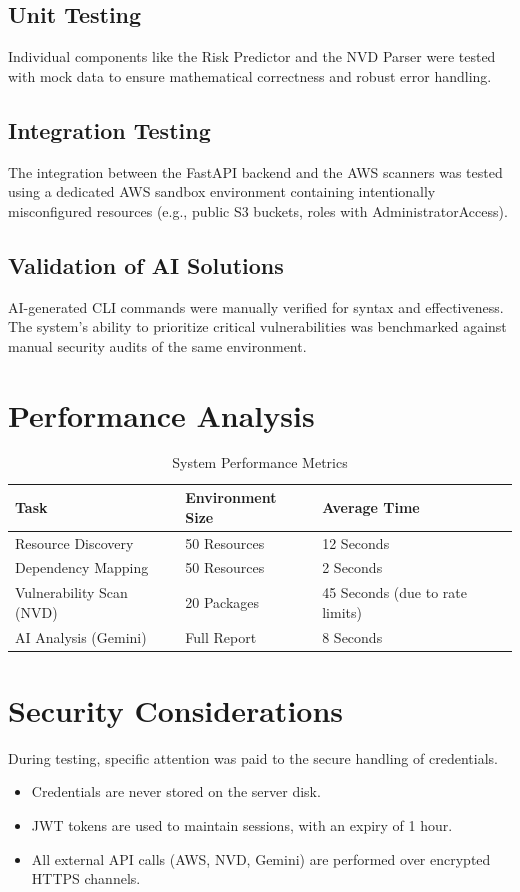\subsection{Unit Testing}
Individual components like the Risk Predictor and the NVD Parser were tested with mock data to ensure mathematical correctness and robust error handling.

\subsection{Integration Testing}
The integration between the FastAPI backend and the AWS scanners was tested using a dedicated AWS sandbox environment containing intentionally misconfigured resources (e.g., public S3 buckets, roles with AdministratorAccess).

\subsection{Validation of AI Solutions}
AI-generated CLI commands were manually verified for syntax and effectiveness. The system's ability to prioritize critical vulnerabilities was benchmarked against manual security audits of the same environment.

\section{Performance Analysis}
\begin{table}[h]
\centering
\caption{System Performance Metrics}
\renewcommand{\arraystretch}{1.3}
\begin{tabular}{|l|l|l|}
\hline
\textbf{Task} & \textbf{Environment Size} & \textbf{Average Time} \\
\hline
Resource Discovery & 50 Resources & 12 Seconds \\
Dependency Mapping & 50 Resources & 2 Seconds \\
Vulnerability Scan (NVD) & 20 Packages & 45 Seconds (due to rate limits) \\
AI Analysis (Gemini) & Full Report & 8 Seconds \\
\hline
\end{tabular}
\end{table}

\section{Security Considerations}
During testing, specific attention was paid to the secure handling of credentials.
\begin{itemize}
    \item Credentials are never stored on the server disk.
    \item JWT tokens are used to maintain sessions, with an expiry of 1 hour.
    \item All external API calls (AWS, NVD, Gemini) are performed over encrypted HTTPS channels.
\end{itemize}
